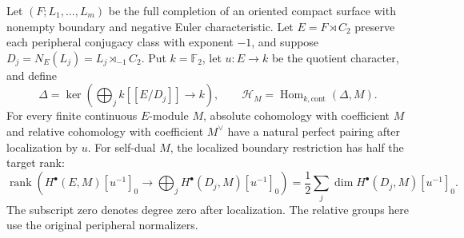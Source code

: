 Let $(F;L_1,\ldots,L_m)$ be the full completion of an
oriented compact surface with nonempty boundary and
negative Euler characteristic.  Let $E=F\rtimes C_2$
preserve each peripheral conjugacy class with exponent
$-1$, and suppose $D_j=N_E(L_j)=L_j\rtimes_{-1}C_2$.
Put $k=\mathbb F_2$, let $u:E\to k$ be the quotient
character, and define
\[
 \Delta=\ker\left(\bigoplus_j k[[E/D_j]]\longrightarrow k\right),
 \qquad \mathscr H_M=\operatorname{Hom}_{k,\mathrm{cont}}(\Delta,M).
\]
For every finite continuous $E$-module $M$, absolute
cohomology with coefficient $M$ and relative cohomology
with coefficient $M^\vee$ have a natural perfect pairing
after localization by $u$.  For self-dual $M$, the
localized boundary restriction has half the target rank:
\[
 \operatorname{rank}\left(
 H^\bullet(E,M)[u^{-1}]_0\longrightarrow
 \bigoplus_jH^\bullet(D_j,M)[u^{-1}]_0\right)
 =\frac12\sum_j\dim H^\bullet(D_j,M)[u^{-1}]_0.               \tag{C.6.1}
\]
The subscript zero denotes degree zero after localization.
The relative groups here use the original peripheral
normalizers.

